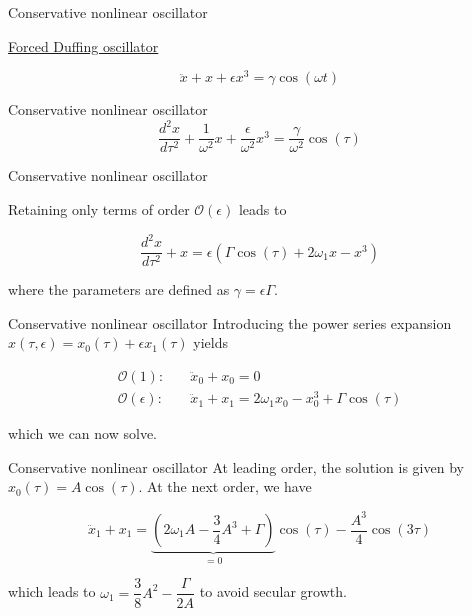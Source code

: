 \documentclass[aspectratio=169]{beamer}
\begin{document}
\begin{frame}[t, c]{Conservative nonlinear oscillator}{}
  \vfill
  \centering
  \large

  \underline{Forced Duffing oscillator}

  \[
  \ddot{x} + x + \epsilon x^3 = \gamma \cos(\omega t)
  \]

  \vfill
\end{frame}

\begin{frame}[t, c]{Conservative nonlinear oscillator}{}
  \vfill
  \large
  \[
  \dfrac{d^2 x}{d\tau^2} + \dfrac{1}{\omega^2} x + \dfrac{\epsilon}{\omega^2} x^3 = \dfrac{\gamma}{\omega^2}\cos(\tau)
  \]
  \vfill
\end{frame}


\begin{frame}[t, c]{Conservative nonlinear oscillator}{}
  \vfill
  \large

  Retaining only terms of order $\mathcal{O}(\epsilon)$ leads to

  \[
  \dfrac{d^2 x}{d\tau^2} +  x  = \epsilon \left( \Gamma \cos(\tau) +2\omega_1 x - x^3  \right)
  \]

  \medskip

  where the parameters are defined as \(\gamma = \epsilon \Gamma \).
  \vfill
\end{frame}

\begin{frame}[t, c]{Conservative nonlinear oscillator}{}
  \vfill
  \large
  Introducing the power series expansion $x(\tau, \epsilon) = x_0(\tau) + \epsilon x_1(\tau)$ yields

  \[
  \begin{aligned}
    \mathcal{O}(1) : & \quad \ddot{x}_0 + x_0 = 0 \\
    \mathcal{O}(\epsilon) : & \quad \ddot{x}_1 + x_1 = 2\omega_1 x_0 - x_0^3 + \Gamma \cos(\tau)
  \end{aligned}
  \]

  which we can now solve.
  \vfill
\end{frame}

\begin{frame}[t, c]{Conservative nonlinear oscillator}{}
  \vfill
  \large
  At leading order, the solution is given by $x_0(\tau) = A \cos(\tau)$.
  At the next order, we have

  \[
  \ddot{x}_1 + x_1 = \underbrace{\left( 2 \omega_1 A - \dfrac{3}{4} A^3 + \Gamma \right)}_{=0} \cos(\tau) - \dfrac{A^3}{4} \cos(3\tau)
  \]

  which leads to $\omega_1 = \dfrac{3}{8} A^2 - \dfrac{\Gamma}{2A}$ to avoid secular growth.

  \vfill
\end{frame}
\end{document}
